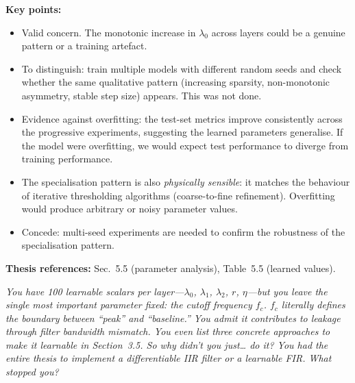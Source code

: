 \documentclass[11pt, letterpaper]{article}
\newcounter{qcounter}
\newcommand{\question}[1]{%
  \stepcounter{qcounter}%
  \begin{questionbox}[Q\theqcounter]%
    \itshape #1%
  \end{questionbox}%
}
\begin{document}
\begin{answerbox}
\textbf{Key points:}
\begin{itemize}[nosep]
  \item Valid concern.  The monotonic increase in $\lambda_0$ across
        layers could be a genuine pattern or a training artefact.
  \item To distinguish: train multiple models with different random
        seeds and check whether the same qualitative pattern
        (increasing sparsity, non-monotonic asymmetry, stable step
        size) appears.  This was not done.
  \item Evidence against overfitting: the test-set metrics improve
        consistently across the progressive experiments, suggesting
        the learned parameters generalise.  If the model were
        overfitting, we would expect test performance to diverge from
        training performance.
  \item The specialisation pattern is also \emph{physically sensible}:
        it matches the behaviour of iterative thresholding algorithms
        (coarse-to-fine refinement).  Overfitting would produce
        arbitrary or noisy parameter values.
  \item Concede: multi-seed experiments are needed to confirm the
        robustness of the specialisation pattern.
\end{itemize}
\textbf{Thesis references:} Sec.~5.5 (parameter analysis), Table~5.5 (learned values).
\end{answerbox}

\question{You have 100 learnable scalars per layer---$\lambda_0$,
$\lambda_1$, $\lambda_2$, $r$, $\eta$---but you leave the single
most important parameter \emph{fixed}: the cutoff frequency $f_c$.
$f_c$ literally defines the boundary between ``peak'' and
``baseline.''  You admit it contributes to leakage through filter
bandwidth mismatch.  You even list three concrete approaches to
make it learnable in Section~3.5.  So why didn't you just\ldots
do it?  You had the entire thesis to implement a differentiable
IIR filter or a learnable FIR.  What stopped you?}
\end{document}
